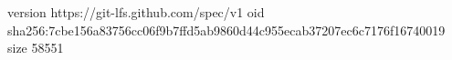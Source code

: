 version https://git-lfs.github.com/spec/v1
oid sha256:7cbe156a83756cc06f9b7ffd5ab9860d44c955ecab37207ec6c7176f16740019
size 58551
